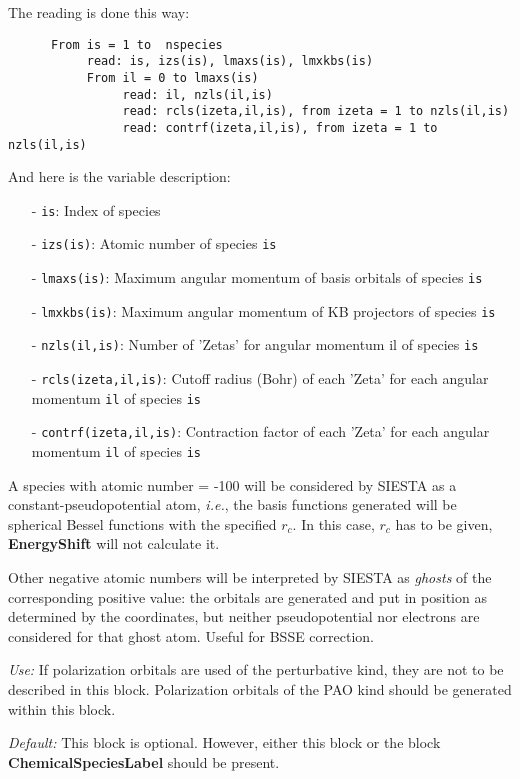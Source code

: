 \begin{description}
\noindent
The reading is done this way:

\begin{verbatim}
      From is = 1 to  nspecies 
           read: is, izs(is), lmaxs(is), lmxkbs(is)
           From il = 0 to lmaxs(is) 
                read: il, nzls(il,is)
                read: rcls(izeta,il,is), from izeta = 1 to nzls(il,is)
                read: contrf(izeta,il,is), from izeta = 1 to nzls(il,is)
\end{verbatim}

\noindent
And here is the variable description:
\begin{itemize}
\item[-] {\tt is}: Index of species
\item[-] {\tt izs(is)}: Atomic number of species {\tt is}
\item[-] {\tt lmaxs(is)}: Maximum angular momentum of 
basis orbitals of species {\tt is}
\item[-] {\tt lmxkbs(is)}: Maximum angular momentum 
of KB projectors of species {\tt is}
\item[-] {\tt nzls(il,is)}: Number of 'Zetas' for angular 
momentum il of species {\tt is}
\item[-] {\tt rcls(izeta,il,is)}: Cutoff radius (Bohr) of 
each 'Zeta' for each angular momentum {\tt il} of species {\tt is}
\item[-] {\tt contrf(izeta,il,is)}: Contraction factor of 
each 'Zeta' for each angular momentum {\tt il} of species {\tt is}
\end{itemize}

A species with atomic number = -100 will be considered by SIESTA as
a constant-pseudopotential atom, {\it i.e.}, the basis functions
generated will be spherical Bessel functions with the specified
$r_c$. In this case, $r_c$ has to be given, {\bf EnergyShift} will
not calculate it.

Other negative atomic numbers will be interpreted by SIESTA as 
{\it ghosts} of the corresponding positive value: the orbitals
are generated and put in position as determined by the coordinates,
but neither pseudopotential nor electrons are considered for that
ghost atom. Useful for BSSE correction.

{\it Use:} If polarization orbitals are used of the perturbative kind,
they are not to be described in this block. Polarization orbitals of
the PAO kind should be generated within this block. 

{\it Default:} This block is optional. However, either this block or the block
{\bf ChemicalSpeciesLabel} should be present.

\end{description}


